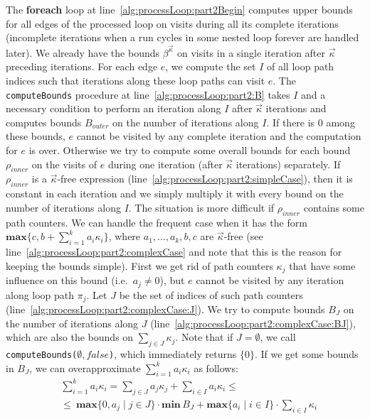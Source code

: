 \documentclass[10pt,a4paper]{article}
\newcommand{\false}{\ensuremath{\mathit{false}}}
\newcommand{\maxim}{\ensuremath{\mathbf{max}}}
\newcommand{\minim}{\ensuremath{\mathbf{min}}}
\begin{document}
The \textbf{foreach} loop at
line~\ref{alg:processLoop:part2Begin} computes upper bounds for all edges of the processed loop on visits during
all its complete iterations (incomplete iterations when a run cycles in
some nested loop forever are handled later). We already have the bounds
$\beta^{\vec{\kappa}}$ on visits in a single iteration after $\vec{\kappa}$
preceding iterations.
For each edge $e$, we compute the set $I$ of all loop path indices such that
iterations along these loop paths can visit $e$. 
The \texttt{computeBounds} procedure at line~\ref{alg:processLoop:part2:B}
takes $I$ and a necessary condition to perform an iteration along $I$ after
$\vec{\kappa}$ iterations and computes bounds $B_\mathit{outer}$ on the
number of iterations along $I$. If there is 0 among these bounds, $e$ cannot
be visited by any complete iteration and the computation for $e$ is
over. Otherwise we try to compute some overall bounds for each bound
$\rho_\mathit{inner}$ on the visits of $e$ during one iteration (after
$\vec{\kappa}$ iterations) separately. If $\rho_{\mathit{inner}}$ is a
$\vec{\kappa}$-free expression
(line~\ref{alg:processLoop:part2:simpleCase}), then it is constant in each
iteration and we simply multiply it with every bound on the number of
iterations along $I$. The situation is more difficult if
$\rho_{\mathit{inner}}$ contains some path counters. We can handle the
frequent case when it has the form
$\maxim\{c,b+\sum_{i=1}^{k}a_i\kappa_i\}$, where $a_1,\ldots,a_k,b,c$ are
$\vec{\kappa}$-free (see line~\ref{alg:processLoop:part2:complexCase} and
note that this is the reason for keeping the bounds simple). First we
get rid of path counters $\kappa_j$ that have some influence on this bound
(i.e.~$a_j\neq 0$), but $e$ cannot be visited by any iteration along loop
path $\pi_j$. Let $J$ be the set of indices of such path counters
(line~\ref{alg:processLoop:part2:complexCase:J}). We try to compute bounds
$B_J$ on the number of iterations along $J$
(line~\ref{alg:processLoop:part2:complexCase:BJ}), which are also the bounds
on $\sum_{j\in J}\kappa_j$. Note that if $J=\emptyset$, we call
\texttt{computeBounds(}$\emptyset,\false$\texttt{)}, which immediately
returns $\{0\}$. If we get some bounds in $B_J$, we can overapproximate
$\sum_{i=1}^{k}a_i\kappa_i$ as follows:
\begin{align*}
&\sum_{i=1}^{k}a_i\kappa_i = \sum_{j\in J}a_j\kappa_j+\sum_{i\in I}a_i\kappa_i
    \le\\
&\le~\maxim\{0,a_j\mid j\in J\}\cdot\minim\,B_J +\maxim\{a_i\mid i\in I\}\cdot\sum_{i\in I}\kappa_i
\end{align*}
\end{document}
